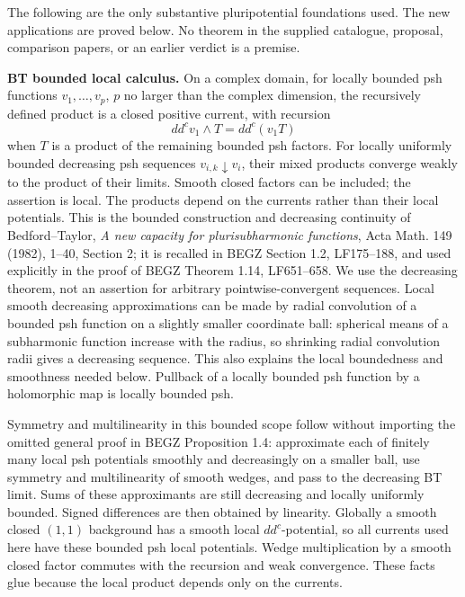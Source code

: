 \documentclass[
  11pt,
]{article}
\begin{document}
The following are the only substantive pluripotential foundations used. The new applications are proved below. No theorem in the supplied catalogue, proposal, comparison papers, or an earlier verdict is a premise.

\textbf{BT bounded local calculus.} On a complex domain, for locally bounded psh functions \(v_1,\ldots,v_p\), \(p\) no larger than the complex dimension, the recursively defined product is a closed positive current, with recursion \[
dd^c v_1\wedge T=dd^c(v_1T)
\] when \(T\) is a product of the remaining bounded psh factors. For locally uniformly bounded decreasing psh sequences \(v_{i,k}\downarrow v_i\), their mixed products converge weakly to the product of their limits. Smooth closed factors can be included; the assertion is local. The products depend on the currents rather than their local potentials. This is the bounded construction and decreasing continuity of Bedford--Taylor, \emph{A new capacity for plurisubharmonic functions}, Acta Math. 149 (1982), 1--40, Section 2; it is recalled in BEGZ Section 1.2, LF175--188, and used explicitly in the proof of BEGZ Theorem 1.14, LF651--658. We use the decreasing theorem, not an assertion for arbitrary pointwise-convergent sequences. Local smooth decreasing approximations can be made by radial convolution of a bounded psh function on a slightly smaller coordinate ball: spherical means of a subharmonic function increase with the radius, so shrinking radial convolution radii gives a decreasing sequence. This also explains the local boundedness and smoothness needed below. Pullback of a locally bounded psh function by a holomorphic map is locally bounded psh.

Symmetry and multilinearity in this bounded scope follow without importing the omitted general proof in BEGZ Proposition 1.4: approximate each of finitely many local psh potentials smoothly and decreasingly on a smaller ball, use symmetry and multilinearity of smooth wedges, and pass to the decreasing BT limit. Sums of these approximants are still decreasing and locally uniformly bounded. Signed differences are then obtained by linearity. Globally a smooth closed \((1,1)\) background has a smooth local \(dd^c\)-potential, so all currents used here have these bounded psh local potentials. Wedge multiplication by a smooth closed factor commutes with the recursion and weak convergence. These facts glue because the local product depends only on the currents.
\end{document}
